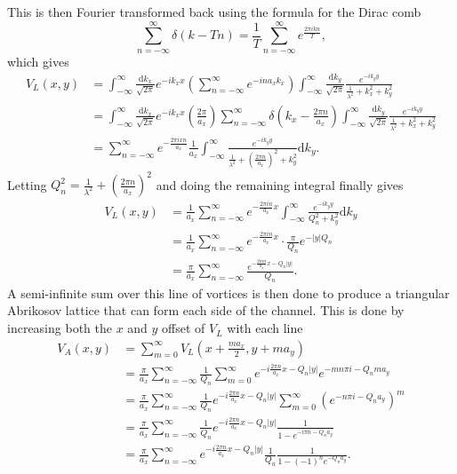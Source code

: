 \documentclass{article}
\numberwithin{equation}{section}
\begin{document}
This is then Fourier transformed back using the formula for the Dirac comb
\begin{equation}
    \sum_{n=-\infty}^\infty\delta(k-Tn) = \frac{1}{T}\sum_{n=-\infty}^\infty e^{\frac{2\pi ikn}{T}},
\end{equation}
which gives
\begin{align*}
    V_L(x, y) &= \int_{-\infty}^\infty\frac{\mathrm{d}k_x}{\sqrt{2\pi}}e^{-ik_xx} \left(\sum_{n=-\infty}^\infty e^{-ina_xk_x}\right) \int_{-\infty}^\infty\frac{\mathrm{d}k_y}{\sqrt{2\pi}} \frac{e^{-ik_yy}}{\frac{1}{\lambda^2}+k_x^2+k_y^2} \\
    &= \int_{-\infty}^\infty\frac{\mathrm{d}k_x}{\sqrt{2\pi}}e^{-ik_xx} \left(\frac{2\pi}{a_x}\right)\sum_{n=-\infty}^\infty
    \delta\left(k_x - \frac{2\pi n}{a_x}\right) \int_{-\infty}^\infty\frac{\mathrm{d}k_y}{\sqrt{2\pi}} \frac{e^{-ik_yy}}{\frac{1}{\lambda^2}+k_x^2+k_y^2} \\
     &= \sum_{n=-\infty}^\infty e^{-\frac{2\pi ixn}{a_x}}\frac{1}{a_x} \int_{-\infty}^\infty\frac{e^{-ik_yy}} {\frac{1}{\lambda^2}+\left(\frac{2\pi n}{a_x}\right)^2+k_y^2}\mathrm{d}k_y.
\end{align*}
Letting $Q_n^2 = \frac{1}{\lambda^2} + \left(\frac{2\pi n}{a_x}\right)^2$ and doing the remaining integral finally gives
\begin{align}
    V_L(x, y) &= \frac{1}{a_x}\sum_{n=-\infty}^\infty e^{-\frac{2\pi in}{a_x}x} \int_{-\infty}^\infty\frac{e^{-ik_yy}} {Q_n^2+k_y^2}\mathrm{d}k_y \nonumber \\
    &= \frac{1}{a_x}\sum_{n=-\infty}^\infty e^{-\frac{2\pi in}{a_x}x}\cdot \frac{\pi}{Q_n}e^{-|y|Q_n} \nonumber \\
    &= \frac{\pi}{a_x}\sum_{n=-\infty}^\infty \frac{e^{-\frac{2\pi in}{a_x}x-Q_n|y|}}{Q_n}.
\end{align}
A semi-infinite sum over this line of vortices is then done to produce a triangular Abrikosov lattice that can form each side of the channel. This is done by increasing both the $x$ and $y$ offset of $V_L$ with each line
\begin{align*}
    V_A(x, y) &= \sum_{m=0}^\infty V_L\left(x+\frac{ma_x}{2},y+ma_y\right) \\
    &= \frac{\pi}{a_x}\sum_{n=-\infty}^\infty\frac{1}{Q_n}\sum_{m=0}^\infty
    e^{-i\frac{2\pi n}{a_x}x-Q_n|y|}e^{-mn\pi i-Q_nma_y} \\
    &= \frac{\pi}{a_x}\sum_{n=-\infty}^\infty\frac{1}{Q_n}e^{-i\frac{2\pi n}{a_x}x-Q_n|y|} \sum_{m=0}^\infty\left(e^{-n\pi i-Q_na_y}\right)^m \\
    &= \frac{\pi}{a_x}\sum_{n=-\infty}^\infty\frac{1}{Q_n}e^{-i\frac{2\pi n}{a_x}x-Q_n|y|} \frac{1}{1-e^{-i\pi n-Q_na_y}} \\
    &= \frac{\pi}{a_x}\sum_{n=-\infty}^\infty e^{-i\frac{2\pi n}{a_x}x-Q_n|y|} \frac{1}{Q_n}\frac{1}{1-(-1)^ne^{-Q_na_y}}.
\end{align*}
\end{document}

